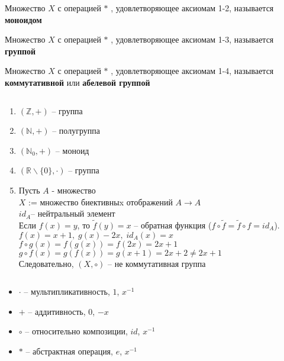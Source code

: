 \documentclass[12pt]{report}
\begin{document}
\begin{defn}
Множество $X$ с операцией $*$ , удовлетворяющее  аксиомам 1-2, называется {\bf моноидом}
\end{defn}

\begin{defn}
Множество $X$ с операцией $*$ , удовлетворяющее  аксиомам 1-3, называется {\bf группой}
\end{defn}

\begin{defn}
Множество $X$ с операцией $*$ , удовлетворяющее  аксиомам 1-4, называется {\bf коммутативной} или {\bf абелевой группой}
\end{defn}

\begin{exs}$ $
\begin{enumerate}
    \item $(\mathbb{Z}, + )$ -- группа
    \item $(\mathbb{N}, + )$ -- полугруппа
    \item $(\mathbb N_0 , +)$ -- моноид
    \item $(\mathbb R \backslash \{0\}, \cdot)$ -- группа
    \item Пусть $A$ - множество\\
	$X$ := множество биективныx отображений $A \to A$\\
	$id_A $-- нейтральный элемент\\
	Если $f(x) = y$, то $\tilde f (y) = x$ -- обратная функция ($f \circ \tilde f = \tilde f \circ f = id_A$).\\
	$f(x) = x+1,\; g(x) - 2x,\;id_A(x)=x$\\
	$f \circ g(x) = f(g(x)) = f(2x) = 2x + 1$\\
	$g \circ f(x) = g(f(x)) = g(x+1) = 2x + 2 \ne 2x+1$\\
	Следовательно, $(X, \circ)$ -- не коммутативная группа
\end{enumerate}
\end{exs}

\begin{name}$ $
\begin{itemize}
    \item $\cdot$ -- мультипликативность, $1$, $x^{-1}$
    \item $+$ -- аддитивность, $0$, $-x$
    \item $\circ$ -- относительно композиции, $id$, $x^{-1}$
    \item $*$ -- абстрактная операция, $e$, $x^{-1}$
\end{itemize}
\end{name}
\end{document}
